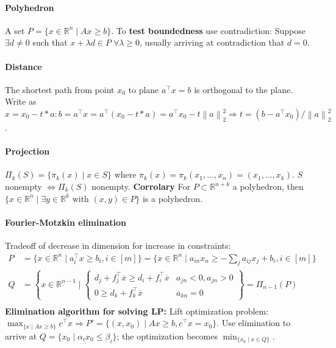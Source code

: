 \documentclass{article}
\newcommand{\norm}[2]{\left\lVert#1\right\rVert_#2}
\begin{document}
\paragraph{Polyhedron} A set $P=\{x \in \mathbb R^n \mid Ax \geq b\}$. To \textbf{test boundedness} use contradiction: Suppose $\exists d\neq 0$ such that $x + \lambda d \in P\; \forall \lambda \geq 0$, usually arriving at contradiction that $d=0$. 

\paragraph{Distance} The shortest path from point $x_0$ to plane $a^\top x = b$ is orthogonal to the plane. Write as $x = x_0 - t*a: b = a^\top x = a^\top (x_0 - t*a) = a^\top x_0 - t\norm{a}{2}^2 \Longrightarrow t = (b - a^\top x_0)/\norm{a}{2}^2$.


\paragraph{Projection} $\Pi_k(S) = \{\pi_k(x) \mid x \in S\}$ where $\pi_k(x) = \pi_k(x_1, \dots, x_n) = (x_1, \dots, x_k)$. $S$ nonempty $\iff \Pi_k(S)$ nonempty. \textbf{Corrolary} For $P\subset \mathbb R^{n+k}$ a polyhedron, then $\{x \in \mathbb R^n \mid \exists y\in \mathbb R^k \text{ with } (x,y)\in P\}$ is a polyhedron. 

\paragraph{Fourier-Motzkin elimination} Tradeoff of decrease in dimension for increase in constraints:
\begin{align*}
    P &= \{x\in \mathbb R^n \mid a_i^\top x \geq b_i, i\in [m]\} = \{x\in \mathbb R^n \mid a_{in}x_n \geq -\sum_j a_{ij}x_j + b_i, i\in [m]\}\\
    Q &= \left\{x\in \mathbb R^{n-1} \mid \begin{cases}
        d_j + f_j^\top \overline x \geq d_i + f_i^\top \overline x & a_{jn}<0, a_{jn}>0\\
        0 \geq d_k + f_k^\top \overline x & a_{kn} = 0
    \end{cases}\right\} = \Pi_{n-1}(P)\\
\end{align*}
\textbf{Elimination algorithm for solving LP:} Lift optimization problem: $\max_{\{x \mid Ax\geq b\}}c^\top x \Rightarrow P' = \{(x, x_0) \mid Ax \geq b, c^\top x = x_0\}$. Use elimination to arrive at $Q = \{ x_0\mid \alpha_i x_0 \leq \beta_i\}$; the optimization becomes $\min_{\{x_0 \mid x \in Q\}}$.
\end{document}
